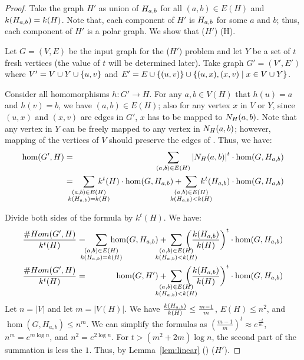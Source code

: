 \begin{proof}
Take the graph \(H'\) as union of \(H_{a,b}\) for all \((a,b)\in E(H)\) and
\(k(H_{a,b})=k(H)\)\@. Note that, each component of \(H'\) is \(H_{a,b}\) for 
some \(a\) and \(b\); thus, each component of \(H'\) is a polar graph.
We show that \chom(\(H'\)) \maple \chom(H)\@.

Let \(G=(V,E)\) be the input graph for the \chom(\(H'\)) problem 
and let \(Y\) be a set of \(t\) fresh vertices
(the value of \(t\) will be determined later). Take graph \(G'=(V',E')\) where
\(V'=V \cup Y \cup \{{u,v}\}\) and \(E'=E \cup \{{(u,v)}\} \cup
\{{(u,x),(x,v) \mid x\in V \cup Y}\}\)\@.

Consider all homomorphisms \(h: G'\to H\)\@.
For any \(a,b\in V(H)\) that \(h(u)=a\) and \(h(v)=b\), we have \((a,b)\in E(H)\); also
for any vertex \(x\) in \(V\) or \(Y\), since \((u,x)\) and \((x,v)\) are edges in \(G'\), 
\(x\) has to be mapped to \(N_{H}({a},{b})\)\@. Note that any vertex in \(Y\) can be freely mapped
to any vertex in \(N_{H}({a},{b})\); however, mapping of the vertices of \(V\) should preserve the edges 
of \mG\@. Thus, we have:
\begin{eqnarray*}
\hom(G',H) &=&  
\sum_{(a,b)\in E(H)}\left|\NHab Hab\right|^ t \cdot
\hom(G,\Hab)\\
&=& 
\bigsum{\substack{(a,b)\in E(H) \\
\magf(H_{a,b})=\magf(H)}} 
\magf^t(H) \cdot \hom(G,H_{a,b})+
\bigsum{\substack{(a,b)\in E(H) \\ \magf(H_{a,b}) < \magf(H)}}k^t
(H_{a,b})\cdot \hom(G,H_{a,b})
\end{eqnarray*}

Divide both sides of the formula by \(k^t(H)\)\@. We have:
\begin{eqnarray*}
\frac{\chom(G',H)}{\magf^t(H)} &=& 
\bigsum{\substack{(a,b)\in E(H) \\ \magf(H_{a,b})=\magf(H)}} 
\hom(G,H_{a,b}) + 
\bigsum{\substack{(a,b)\in E(H) \\ \magf(H_{a,b})<\magf(H)}}
\left(\frac{\magf(H_{a,b})}{\magf(H)} \right )^t
\cdot\hom(G,H_{a,b})\\
\frac{\chom(G',H)}{\magf^t(H)} &=& 
\hom(G,H') + \bigsum{\substack{(a,b)\in E(H) \\ \magf(H_{a,b})<\magf(H)}}
\left(\frac{\magf(H_{a,b})}{\magf(H)} \right )^t
\cdot\hom(G,H_{a,b})\\
\end{eqnarray*}
Let \(n=|V|\) and let \(m=|V(H)|\). We have \(\frac{k(H_{a,b})}{k(H)} \le \frac{m-1}{m}\),
\(E(H)\le n^2\), and \(\hom(G,H_{a,b}) \le n^m\).
We can simplify the formulas as \((\frac{m-1}{m})^t \approx e^{\frac{-t}{m}}\),
\(n^m = e^{m\log n}\), and \(n^2 = e^{2\log n}\).
For \(t > (m^2+2m) \log n\), the second part of the summation is less the \(1\).
Thus, by Lemma~\ref{lem:linear} \chom(\mH) \mapge \chom(\(H'\)).
\end{proof}

